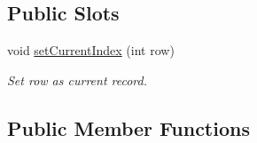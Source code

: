 \subsection*{Public Slots}
\begin{DoxyCompactItemize}
\item 
void \hyperlink{classmdt_sql_table_widget_ae4945234973dcfcb8f2e20830e571fd4}{set\-Current\-Index} (int row)
\begin{DoxyCompactList}\small\item\em Set row as current record. \end{DoxyCompactList}\end{DoxyCompactItemize}
\subsection*{Public Member Functions}
